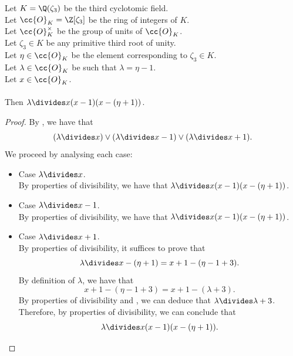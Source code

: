 \begin{lemma}
    \label{lmm:lambda_dvd_mul_sub_one_mul_sub_eta_add_one}
    \leanok
    Let $K = \Q(\zeta_3)$ be the third cyclotomic field. \\
    Let $\cc{O}_K = \Z[\zeta_3]$ be the ring of integers of $K$. \\
    Let $\cc{O}^\times_K$ be the group of units of $\cc{O}_K$. \\
    Let $\zeta_3 \in K$ be any primitive third root of unity. \\
    Let $\eta \in \cc{O}_K$ be the element corresponding to $\zeta_3 \in K$. \\
    Let $\lambda \in \cc{O}_K$ be such that $\lambda = \eta -1$. \\
    Let $x \in \cc{O}_K$. \\\\
    Then $\lambda \divides x(x - 1)(x - (\eta + 1))$.
\end{lemma}
\begin{proof}
    \leanok
    By , we have that
    $$(\lambda \divides x) \lor (\lambda \divides x-1) \lor (\lambda \divides x+1).$$
    We proceed by analysing each case:
    \begin{itemize}
        \item Case $\lambda \divides x$. \\
              By properties of divisibility, we have that
              $\lambda \divides x(x - 1)(x - (\eta + 1))$.
        \item Case $\lambda \divides x-1$. \\
              By properties of divisibility, we have that
              $\lambda \divides x(x - 1)(x - (\eta + 1))$.
        \item Case $\lambda \divides x+1$.\\
              By properties of divisibility, it suffices to prove that
              $$\lambda \divides x - (\eta + 1) = x + 1 - (\eta - 1 + 3).$$
              By definition of $\lambda$, we have that
              $$x + 1 - (\eta - 1 + 3) = x + 1 - (\lambda + 3).$$
              By properties of divisibility and , we can deduce that
              $\lambda \divides \lambda + 3$.\\
              Therefore, by properties of divisibility, we can conclude that
              $$\lambda \divides x(x - 1)(x - (\eta + 1)).$$
    \end{itemize}
\end{proof}

